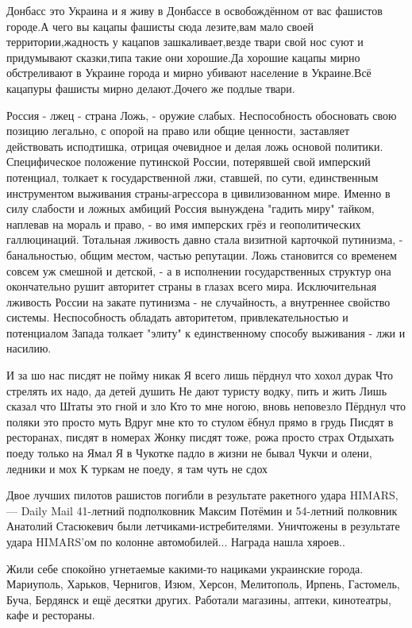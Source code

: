 Донбасс это Украина и я живу в Донбассе в освобождённом от вас фашистов
городе.А чего вы кацапы фашисты сюда лезите,вам мало своей территории,жадность
у кацапов зашкаливает,везде твари свой нос суют и придумывают сказки,типа такие
они хорошие.Да хорошие кацапы мирно обстреливают в Украине города и мирно
убивают население в Украине.Всё кацапуры фашисты мирно делают.Дочего же подлые
твари.

Россия - лжец - страна Ложь, - оружие слабых. Неспособность обосновать свою
позицию легально, с опорой на право или общие ценности, заставляет действовать
исподтишка, отрицая очевидное и делая ложь основой политики. Специфическое
положение путинской России, потерявшей свой имперский потенциал, толкает к
государственной лжи, ставшей, по сути, единственным инструментом выживания
страны-агрессора в цивилизованном мире. Именно в силу слабости и ложных амбиций
Россия вынуждена "гадить миру" тайком, наплевав на мораль и право, - во имя
имперских грёз и геополитических галлюцинаций. Тотальная лживость давно стала
визитной карточкой путинизма, - банальностью, общим местом, частью репутации.
Ложь становится со временем совсем уж смешной и детской, - а в исполнении
государственных структур она окончательно рушит авторитет страны в глазах всего
мира. Исключительная лживость России на закате путинизма - не случайность, а
внутреннее свойство системы. Неспособность обладать авторитетом,
привлекательностью и потенциалом Запада толкает "элиту" к единственному способу
выживания - лжи и насилию.

И за шо нас писдят не пойму никак
Я всего лишь пёрднул что хохол дурак
Что стрелять их надо, да детей душить
Не дают туристу водку, пить и жить
Лишь сказал что Штаты это гной и зло
Кто то мне ногою, вновь неповезло
Пёрднул что поляки это просто муть
Вдруг мне кто то стулом ёбнул прямо в грудь
Писдят в ресторанах, писдят в номерах
Жонку писдят тоже, рожа просто страх
Отдыхать поеду только на Ямал
Я в Чукотке падло в жизни не бывал
Чукчи и олени, ледники и мох
К туркам не поеду, я там чуть не сдох

Двое лучших пилотов рашистов погибли в результате ракетного удара HIMARS, — Daily Mail
41-летний подполковник Максим Потёмин и 54-летний полковник Анатолий Стасюкевич были летчиками-истребителями.
Уничтожены в результате удара HIMARS'ом по колонне автомобилей... Награда нашла хяроев..


Жили себе спокойно угнетаемые какими-то нациками украинские города. Мариуполь,
Харьков, Чернигов, Изюм, Херсон, Мелитополь, Ирпень, Гастомель, Буча, Бердянск
и ещё десятки других. Работали магазины, аптеки, кинотеатры, кафе и рестораны. 

